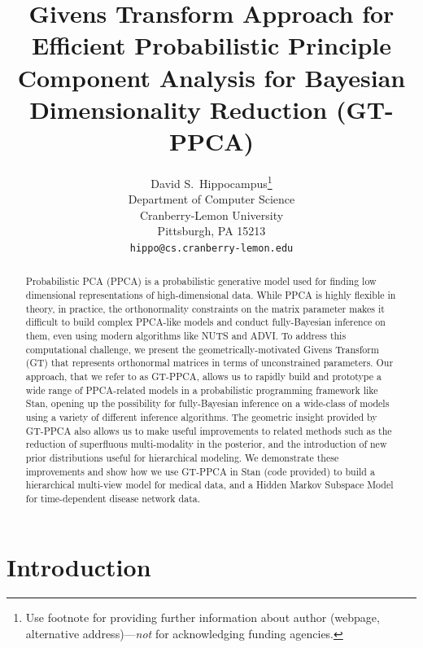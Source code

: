 \documentclass{article}
\title{Givens Transform Approach for Efficient Probabilistic Principle Component Analysis for Bayesian Dimensionality Reduction (GT-PPCA)}
\author{
  David S.~Hippocampus\thanks{Use footnote for providing further
    information about author (webpage, alternative
    address)---\emph{not} for acknowledging funding agencies.} \\
  Department of Computer Science\\
  Cranberry-Lemon University\\
  Pittsburgh, PA 15213 \\
  \texttt{hippo@cs.cranberry-lemon.edu} \\
}
\begin{document}

\maketitle

\begin{abstract}
Probabilistic PCA (PPCA) is a probabilistic generative model used for finding low dimensional representations of high-dimensional data. While PPCA is highly flexible in theory, in practice, the orthonormality constraints on the matrix parameter makes it difficult to build complex PPCA-like models and conduct fully-Bayesian inference on them, even using modern algorithms like NUTS and ADVI. To address this computational challenge, we present the geometrically-motivated Givens Transform (GT) that represents orthonormal matrices in terms of unconstrained parameters. Our approach, that we refer to as GT-PPCA, allows us to rapidly build and prototype a wide range of PPCA-related models in a probabilistic programming framework like Stan, opening up the possibility for fully-Bayesian inference on a wide-class of models using a variety of different inference algorithms. The geometric insight provided by GT-PPCA also allows us to make useful improvements to related methods such as the reduction of superfluous multi-modality in the posterior, and the introduction of new prior distributions useful for hierarchical modeling. We demonstrate these improvements and show how we use GT-PPCA in Stan (code provided) to build a hierarchical multi-view model for medical data, and a Hidden Markov Subspace Model for time-dependent disease network data.
\end{abstract}

\section{Introduction}
\end{document}
